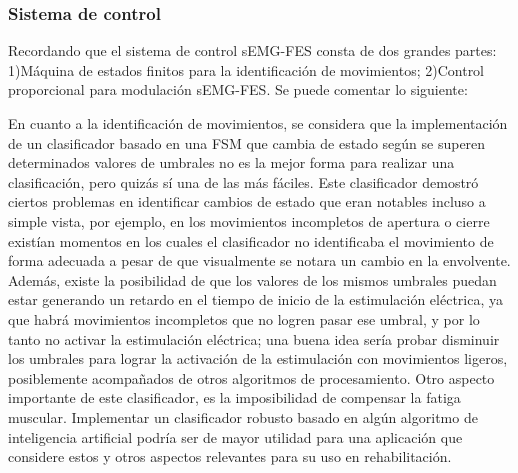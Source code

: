 \subsubsection*{Sistema de control}
Recordando que el sistema de control sEMG-FES consta de dos grandes partes: 1)Máquina de estados finitos para la identificación de movimientos; 2)Control proporcional para modulación sEMG-FES. Se puede comentar lo siguiente:

En cuanto a la identificación de movimientos, se considera que la implementación de un clasificador basado en una FSM que cambia de estado según se superen determinados valores de umbrales no es la mejor forma para realizar una clasificación, pero quizás sí una de las más fáciles. Este clasificador demostró ciertos problemas en identificar cambios de estado que eran notables incluso a simple vista, por ejemplo, en los movimientos incompletos de apertura o cierre existían momentos en los cuales el clasificador no identificaba el movimiento de forma adecuada a pesar de que visualmente se notara un cambio en la envolvente. Además, existe la posibilidad de que los valores de los mismos umbrales puedan estar generando un retardo en el tiempo de inicio de la estimulación eléctrica, ya que habrá movimientos incompletos que no logren pasar ese umbral, y por lo tanto no activar la estimulación eléctrica; una buena idea sería probar disminuir los umbrales para lograr la activación de la estimulación con movimientos ligeros, posiblemente acompañados de otros algoritmos de procesamiento. Otro aspecto importante de este clasificador, es la imposibilidad de compensar la fatiga muscular. Implementar un clasificador robusto basado en algún algoritmo de inteligencia artificial podría ser de mayor utilidad para una aplicación que considere estos y otros aspectos relevantes para su uso en rehabilitación.

